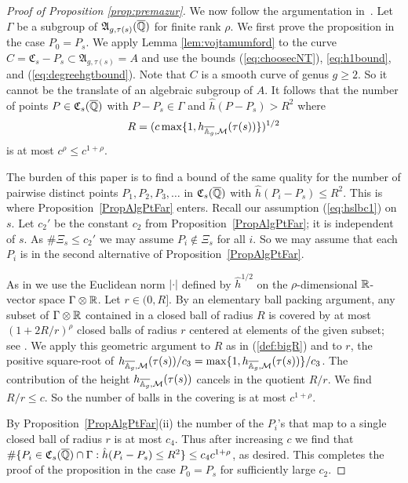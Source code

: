\begin{proof}[Proof of Proposition \ref{prop:premazur}]
  \bigskip

  We now follow the argumentation in~\cite{DGH1p}. Let $\Gamma$ be a
  subgroup of $\mathfrak{A}_{g,\tau(s)}({\overline{\mathbb{Q}}})$ for finite rank $\rho$.
  We first prove the proposition in the case $P_0=P_s$. We apply Lemma
  \ref{lem:vojtamumford}  to the curve $C =
  \mathfrak{C}_s-P_s\subset \mathfrak{A}_{g,\tau(s)}=A$ and use the bounds
  (\ref{eq:choosecNT}), \eqref{eq:h1bound}, and 
  (\ref{eq:degreehgtbound}).
  Note that $C$ is a smooth curve of genus
  $g\ge 2$. So it cannot be the translate of an algebraic subgroup of
  $A$.
  It follows that the number of points $P\in
  \mathfrak{C}_s({\overline{\mathbb{Q}}})$ with $P-P_s\in \Gamma$ and $\hat h(P-P_s) >
  R^2$ where 
  \begin{equation}
    \label{def:bigR}
    R= (c\max\{1,h_{\overline{\mathbb{A}_g},{\mathcal M}}(\tau(s))\})^{1/2}    
  \end{equation}
  is at most  $c^{\rho}\le c^{1+\rho}$.

  The burden of this paper is  to find a bound of the same quality 
  for the number of pairwise distinct points $P_1,P_2,P_3,\ldots$  in
  $\mathfrak{C}_s({\overline{\mathbb{Q}}})$ with $\hat h(P_i-P_s) \le R^2$. This is where
  Proposition~\ref{PropAlgPtFar} enters. Recall our assumption
  (\ref{eq:hslbc1}) on $s$.
  Let $c_2'$ be the constant $c_2$ from Proposition~\ref{PropAlgPtFar}; it is independent of $s$. As
  $\# \Xi_s\le c_2'$ we may assume $P_i\not\in \Xi_s$ for all $i$. 
  So we may assume that each $P_i$ is in the second alternative of
  Proposition~\ref{PropAlgPtFar}.

  As in \cite{DGH1p} we use the Euclidean norm $|\cdot|$ defined by $\hat h^{1/2}$ on
  the $\rho$-dimensional  ${\mathbb{R}}$-vector space $\Gamma\otimes{\mathbb{R}}$. 
  Let $r\in (0,R]$. By an elementary ball packing argument, any subset of
  $\Gamma\otimes{\mathbb{R}}$ contained in a closed ball of radius $R$ is
  covered by at most $(1+2R/r)^{\rho}$ closed balls of radius $r$ centered at
  elements of the given subset; see \cite[Lemme~6.1]{Remond:Decompte}.
  We apply this geometric argument to $R$ as in (\ref{def:bigR}) and
  to  $r$, the positive square-root of 
  $h_{\overline{\mathbb{A}_g},{\mathcal M}}(\tau(s))/c_3 =
  \max\{1,h_{\overline{\mathbb{A}_g},{\mathcal M}}(\tau(s))\}/c_3$.
  The contribution of the height
  $h_{\overline{\mathbb{A}_g},{\mathcal M}}(\tau(s))$ cancels in the quotient
  $R/r$. We find $R/r\le c$. So the
  number of balls in the covering is at most $c^{1+\rho}$. 

  By Proposition~\ref{PropAlgPtFar}(ii) the number of the $P_i$'s that
  map to a single closed ball of radius $r$ is
  at most $c_4$. Thus after increasing $c$ we find that $\#\{P_i \in \mathfrak{C}_s({\overline{\mathbb{Q}}})\cap \Gamma : \hat{h}(P_i-P_s) \le R^2\} \le c_4 c^{1+\rho}$, %
as desired. 
  This completes the proof of the proposition in the case $P_0=P_s$
  for sufficiently large $c_2$.


\end{proof}
